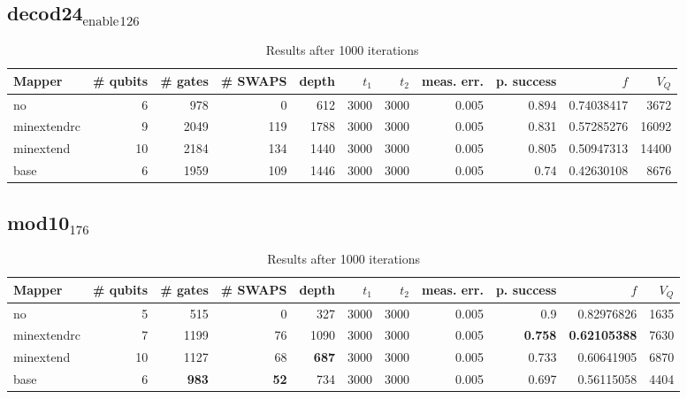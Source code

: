 \documentclass[11pt]{article}
\begin{document}
\subsection{decod24\(_{\text{enable}}\)\(_{\text{126}}\)}
\label{sec:org5a6ec3c}
\begin{table}[H]
\caption{\label{tab:org635c13f}
Results after 1000 iterations}
\centering
\small
\begin{tabular}{lrrrrrrrrrr}
\hline
Mapper & \# qubits & \# gates & \# SWAPS & depth & \(t_1\) & \(t_2\) & meas. err. & p. success & \(f\) & \(V_Q\)\\
\hline
no & 6 & 978 & 0 & 612 & 3000 & 3000 & 0.005 & 0.894 & 0.74038417 & 3672\\
\hline
minextendrc & 9 & 2049 & 119 & 1788 & 3000 & 3000 & 0.005 & 0.831 & 0.57285276 & 16092\\
minextend & 10 & 2184 & 134 & 1440 & 3000 & 3000 & 0.005 & 0.805 & 0.50947313 & 14400\\
base & 6 & 1959 & 109 & 1446 & 3000 & 3000 & 0.005 & 0.74 & 0.42630108 & 8676\\
\hline
\end{tabular}
\end{table}

\subsection{mod10\(_{\text{176}}\)}
\label{sec:orgd94903e}
\begin{table}[H]
\caption{\label{tab:org5fab0a4}
Results after 1000 iterations}
\centering
\small
\begin{tabular}{lrrrrrrrrrr}
\hline
Mapper & \# qubits & \# gates & \# SWAPS & depth & \(t_1\) & \(t_2\) & meas. err. & p. success & \(f\) & \(V_Q\)\\
\hline
no & 5 & 515 & 0 & 327 & 3000 & 3000 & 0.005 & 0.9 & 0.82976826 & 1635\\
\hline
minextendrc & 7 & 1199 & 76 & 1090 & 3000 & 3000 & 0.005 & \textbf{0.758} & \textbf{0.62105388} & 7630\\
minextend & 10 & 1127 & 68 & \textbf{687} & 3000 & 3000 & 0.005 & 0.733 & 0.60641905 & 6870\\
base & 6 & \textbf{983} & \textbf{52} & 734 & 3000 & 3000 & 0.005 & 0.697 & 0.56115058 & 4404\\
\hline
\end{tabular}
\end{table}
\end{document}
